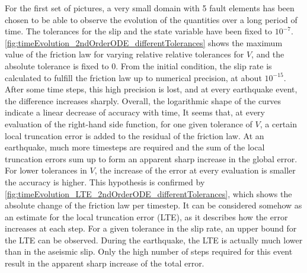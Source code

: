 For the first set of pictures, a very small domain with 5 fault elements has been chosen to be able to observe the evolution of the quantities over a long period of time. The tolerances for the slip and the state variable have been fixed to $10^{-7}$. \autoref{fig:timeEvolution_2ndOrderODE_differentTolerances} shows the maximum value of the friction law for varying relative relative tolerances for $V$, and the absolute tolerance is fixed to 0. From the initial condition, the slip rate is calculated to fulfill the friction law up to numerical precision, at about $10^{-15}$. After some time steps, this high precision is lost, and at every earthquake event, the difference increases sharply. Overall, the logarithmic shape of the curves indicate a linear decrease of accuracy with time, It seems that, at every evaluation of the right-hand side function, for one given tolerance of $V$, a certain local truncation error is added to the residual of the friction law. At an earthquake, much more timesteps are required and the sum of the local truncation errors sum up to form an apparent sharp increase in the global error. For lower tolerances in $V$, the increase of the error at every evaluation is smaller the accuracy is higher. This hypothesis is confirmed by \autoref{fig:timeEvolution_LTE_2ndOrderODE_differentTolerances}, which shows the absolute change of the friction law per timestep. It can be considered somehow as an estimate for the local truncation error (LTE), as it describes how the error increases at each step. For a given tolerance in the slip rate, an upper bound for the LTE can be observed. During the earthquake, the LTE is actually much lower than in the aseismic slip. Only the high number of steps required for this event result in the apparent sharp increase of the total error. 

